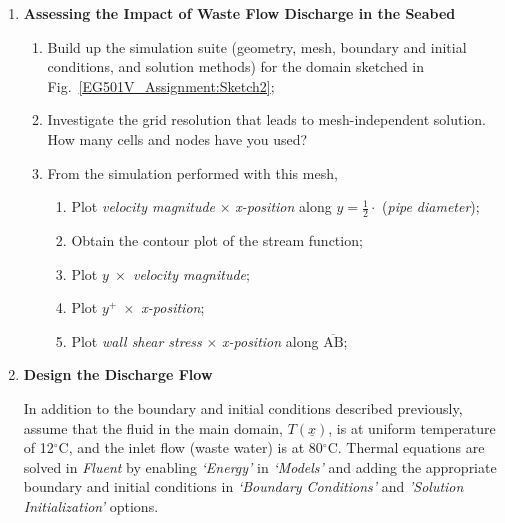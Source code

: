 \documentclass[12pts,a4paper,amsmath,amssymb,floatfix]{article}%
\newcommand{\frc}{\displaystyle\frac}
\begin{document}
\begin{enumerate}[label=\bfseries Problem \arabic*:]
\begin{enumerate}[label=\bfseries Task \arabic*]

\item\label{Practical2:Task1} {\bf Assessing the Impact of Waste Flow Discharge in the Seabed}
  \begin{enumerate}
  \item Build up the simulation suite (geometry, mesh, boundary and initial conditions, and solution methods) for the domain sketched in Fig.~\ref{EG501V_Assignment:Sketch2};
     \item Investigate the grid resolution that leads to mesh-independent solution. How many cells and nodes have you used?
     \item From the simulation performed with this mesh,
         \begin{enumerate}
            \item Plot {\it velocity magnitude} $\times$ {\it x-position} along $y =\frc{1}{2}\cdot$ ({\it pipe diameter});
            \item Obtain the contour plot of the stream function;
            \item Plot $y \;\times$ {\it velocity magnitude};
            \item Plot $y^{+}\;\times$ {\it x-position};
            \item Plot {\it wall shear stress} $\times$ {\it x-position} along $\overline{\text{AB}}$;
         \end{enumerate}
  \end{enumerate}


\item\label{Practical2:Task2} {\bf Design the Discharge Flow}

In addition to the boundary and initial conditions described previously, assume that the fluid in the main domain, $T\left(\underline{x}\right)$, is at uniform temperature of 12$^{\circ}$C, and the inlet flow (waste water) is at 80$^{\circ}$C. Thermal equations are solved in {\it Fluent} by enabling {\it `Energy'} in {\it `Models'} and adding the appropriate boundary and initial conditions in {\it `Boundary Conditions'} and {\it 'Solution Initialization'} options.


\end{enumerate}
\end{enumerate}
\end{document}
